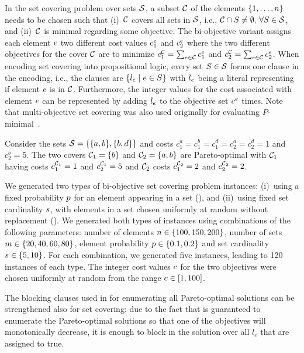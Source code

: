 In the set covering problem over sets $\mathcal{S}$, a subset $\mathcal{C}$ of the elements $\{1,\dots,n\}$ needs to be chosen such that (i)~$\mathcal{C}$ covers all sets in $\mathcal{S}$, i.e., $\mathcal{C}\cap S\neq\emptyset,\,\forall S\in\mathcal{S}$, and (ii)~$\mathcal{C}$ is minimal regarding some objective.
The bi-objective variant assigns each element $e$ two different cost values $c^e_1$ and $c^e_2$ where the two different objectives for the cover $\mathcal{C}$ are to minimize $c^{\mathcal{C}}_1 = \sum_{e\in\mathcal{C}}c^e_1$ and $c^{\mathcal{C}}_2 = \sum_{e\in\mathcal{C}}c^e_2$.
When encoding set covering into propositional logic, every set $S\in\mathcal{S}$ forms one clause in the encoding, i.e., the clauses are $\{l_e \mid e\in S\}$ with $l_e$ being a literal representing if element $e$ is in $\mathcal{C}$.
Furthermore, the integer values for the cost associated with element $e$ can be represented by adding $l_e$ to the objective set $c^e$ times.
Note that multi-objective set covering was also used originally for evaluating $P$-minimal~\autocite{DBLP:conf/cp/SohBTB17}.

\begin{example}
  Consider the sets $\mathcal{S} = \{ \{a, b\}, \{b, d\} \}$ and costs $c^a_1 = c^b_1 = c^d_1 = c^a_2 = c^d_2 = 1$ and $c^b_2 = 5$.
  The two covers $\mathcal{C}_1 = \{ b \}$ and $\mathcal{C}_2 = \{ a, b \}$ are Pareto-optimal with $\mathcal{C}_1$ having costs $c^{\mathcal{C}_1}_1 = 1$ and $c^{\mathcal{C}_1}_2 = 5$ and $\mathcal{C}_2$ costs $c^{\mathcal{C}_2}_1 = 2$ and $c^{\mathcal{C}_2}_2 = 2$.
\end{example}

We generated two types of  bi-objective set covering problem instances:
(i)~using a fixed probability $p$ for an element appearing in a set (\scep{}), and (ii)~using fixed set cardinality $s$, with elements in a set chosen uniformly at random without replacement (\scsc{}).
We generated both types of instances using combinations of the following parameters:
number of elements $n\in\{100,150,200\}$, number of sets $m\in\{20,40,60,80\}$, element probability $p\in\{0.1,0.2\}$ and set cardinality $s\in\{5,10\}$.
For each combination, we generated five instances, leading to 120 instances of each type.
The integer cost values $c$ for the two objectives were chosen uniformly at random from the range $c\in[1,100]$.

The blocking clauses used in \algname{} for enumerating all Pareto-optimal solutions can be strengthened also for set covering:
due to the fact that \algname{} is guaranteed to enumerate the Pareto-optimal solutions so that one of the objectives will monotonically decrease, it is enough to block in \algname{} the solution over all $l_e$ that are assigned to true.

